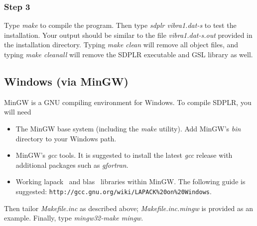 \documentclass[12pt]{article}
\newcommand{\blas}{{\sc blas}}
\newcommand{\lapack}{{\sc lapack}}
\begin{document}
\subsubsection*{Step 3}

Type {\sl make} to compile the program. Then type {\sl sdplr
vibra1.dat-s} to test the installation. Your output should be similar to
the file {\sl vibra1.dat-s.out} provided in the installation directory.
Typing {\sl make clean} will remove all object files, and typing {\sl
make cleanall} will remove the SDPLR executable and GSL library as well.



\subsection{Windows (via MinGW)}

MinGW is a GNU compiling environment for Windows. To compile SDPLR, you will need

\begin{itemize}

\item The MinGW base system (including the {\sl make\/} utility). Add
MinGW's {\sl bin\/} directory to your Windows path.

\item MinGW's {\sl gcc\/} tools. It is suggested to install the latest
{\sl gcc\/} release with additional packages such as {\sl gfortran\/}.

\item Working \lapack~ and \blas~ libraries within MinGW. The following
guide is suggested: {\tt http://gcc.gnu.org/wiki/LAPACK\%20on\%20Windows}.

\end{itemize}

Then tailor {\sl Makefile.inc\/} as described above; {\sl
Makefile.inc.mingw} is provided as an example. Finally, type
{\sl mingw32-make mingw\/}.
\end{document}

